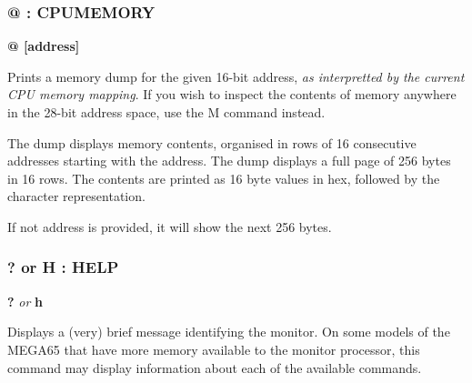 \subsubsection{@ : CPUMEMORY}
\begin{description}[leftmargin=2cm,style=nextline]
\item [Format:] {\bf @ [address]}
\item [Usage:] Prints a memory dump for the given 16-bit address,
  {\em as interpretted by the current CPU memory mapping}.
  If you wish to inspect the contents of memory anywhere in the 28-bit
  address space, use the M command instead.

  The dump displays memory contents, organised in rows
  of 16 consecutive addresses starting with the
  address. The dump displays
  a full page of 256 bytes in 16 rows.
  The contents are printed as 16 byte values in hex,
  followed by the character representation.

\item [Remarks:] If not address is provided, it will show the next 256 bytes.

\end{description}

\subsubsection{? or H : HELP}
\begin{description}[leftmargin=2cm,style=nextline]
\item [Format:] {\bf ?} {\em or} {\bf h}
\item [Usage:] Displays a (very) brief message identifying the monitor.
  On some models of the MEGA65 that have more memory available to the
  monitor processor, this command may display information about each
  of the available commands.

\end{description}


